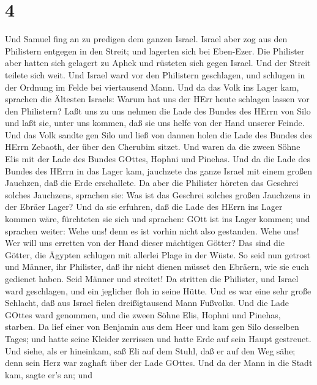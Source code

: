 \hypertarget{section-3}{%
\section{4}\label{section-3}}

 Und Samuel fing an zu predigen dem ganzen Israel. Israel
aber zog aus den Philistern entgegen in den Streit; und lagerten sich
bei Eben-Ezer. Die Philister aber hatten sich gelagert zu Aphek
 und rüsteten sich gegen Israel. Und der Streit teilete sich
weit. Und Israel ward vor den Philistern geschlagen, und schlugen in der
Ordnung im Felde bei viertausend Mann.  Und da das Volk ins
Lager kam, sprachen die Ältesten Israels: Warum hat uns der HErr heute
schlagen lassen vor den Philistern? Laßt uns zu uns nehmen die Lade des
Bundes des HErrn von Silo und laßt sie, unter uns kommen, daß sie uns
helfe von der Hand unserer Feinde.  Und das Volk sandte gen
Silo und ließ von dannen holen die Lade des Bundes des HErrn Zebaoth,
der über den Cherubim sitzet. Und waren da die zween Söhne Elis mit der
Lade des Bundes GOttes, Hophni und Pinehas.  Und da die Lade
des Bundes des HErrn in das Lager kam, jauchzete das ganze Israel mit
einem großen Jauchzen, daß die Erde erschallete.  Da aber
die Philister höreten das Geschrei solches Jauchzens, sprachen sie: Was
ist das Geschrei solches großen Jauchzens in der Ebräer Lager? Und da
sie erfuhren, daß die Lade des HErrn ins Lager kommen wäre, 
fürchteten sie sich und sprachen: GOtt ist ins Lager kommen; und
sprachen weiter: Wehe uns! denn es ist vorhin nicht also gestanden.
 Wehe uns! Wer will uns erretten von der Hand dieser
mächtigen Götter? Das sind die Götter, die Ägypten schlugen mit allerlei
Plage in der Wüste.  So seid nun getrost und Männer, ihr
Philister, daß ihr nicht dienen müsset den Ebräern, wie sie euch
gedienet haben. Seid Männer und streitet!  Da stritten die
Philister, und Israel ward geschlagen, und ein jeglicher floh in seine
Hütte. Und es war eine sehr große Schlacht, daß aus Israel fielen
dreißigtausend Mann Fußvolks.  Und die Lade GOttes ward
genommen, und die zween Söhne Elis, Hophni und Pinehas, starben.
 Da lief einer von Benjamin aus dem Heer und kam gen Silo
desselben Tages; und hatte seine Kleider zerrissen und hatte Erde auf
sein Haupt gestreuet.  Und siehe, als er hineinkam, saß Eli
auf dem Stuhl, daß er auf den Weg sähe; denn sein Herz war zaghaft über
der Lade GOttes. Und da der Mann in die Stadt kam, sagte er's an; und
